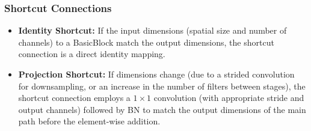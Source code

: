 \documentclass[11pt, a4paper]{article}
\begin{document}
\subsubsection{Shortcut Connections}
\begin{itemize}[itemsep=0.3em]
    \item \textbf{Identity Shortcut:} If the input dimensions (spatial size and number of channels) to a BasicBlock match the output dimensions, the shortcut connection is a direct identity mapping.
    \item \textbf{Projection Shortcut:} If dimensions change (due to a strided convolution for downsampling, or an increase in the number of filters between stages), the shortcut connection employs a $1 \times 1$ convolution (with appropriate stride and output channels) followed by BN to match the output dimensions of the main path before the element-wise addition.
\end{itemize}
\end{document}
